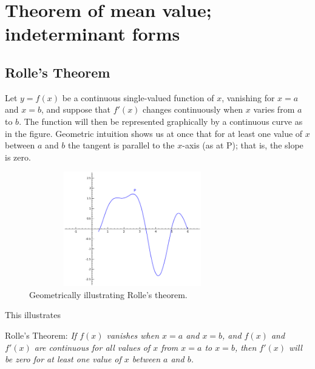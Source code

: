 
\chapter{Theorem of mean value; indeterminant forms}


\section{Rolle's Theorem}
\label{sec:105}

Let $y = f(x)$ be a continuous single-valued function of $x$, 
vanishing for $x = a$ and $x = b$, and suppose that $f'(x)$ 
changes continuously when $x$ varies from $a$ to $b$. 
The function will then be represented graphically by a 
continuous curve as in the figure. Geometric intuition 
shows us at once that for at least one value of $x$ 
between $a$ and $b$ the tangent is parallel to the $x$-axis 
(as at P); that is, the slope is zero. 

\begin{figure}[h!]
\begin{minipage}{\textwidth}
\begin{center}
\includegraphics[height=5cm,width=9cm]{rolles-theorem3.eps}
\end{center}
\end{minipage}
\caption{Geometrically illustrating Rolle's theorem.}
\label{fig:rolles-theorem}
\end{figure}

\noindent
This illustrates 

Rolle's Theorem:
{\it If $f(x)$ vanishes when $x = a$ and $x = b$, and $f(x)$ and 
$f'(x)$ are continuous for all values of $x$ from $x = a$ to 
$x = b$, then $f'(x)$ will be zero for at least one value of 
$x$ between $a$ and $b$.}

